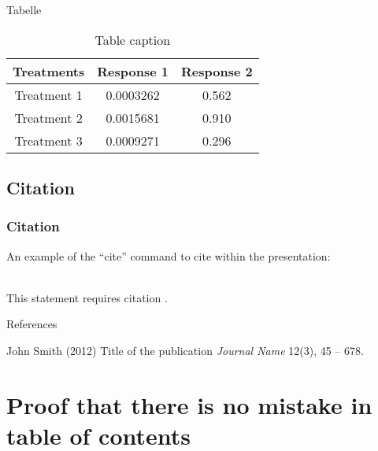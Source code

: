 \begin{frame}{Tabelle}
	\centering
	\begin{table}
		\begin{tabular}{c c c}
			\toprule
			\textbf{Treatments} & \textbf{Response 1} & \textbf{Response 2} \\
			\midrule
			Treatment 1         & 0.0003262           & 0.562               \\
			Treatment 2         & 0.0015681           & 0.910               \\
			Treatment 3         & 0.0009271           & 0.296               \\
			\bottomrule
		\end{tabular}
		\caption{Table caption}
	\end{table}
\end{frame}

\subsection{Citation}

\begin{frame}[Citation]
    \frametitle{Citation}
    An example of the \enquote{cite} command to cite within the presentation:\\~

    This statement requires citation \cite{p1}.
\end{frame}

\begin{frame}{References}
    \footnotesize{
        \begin{thebibliography}{99}
             John Smith (2012)
            \newblock Title of the publication
            \newblock \emph{Journal Name} 12(3), 45 -- 678.
        \end{thebibliography}
    }
\end{frame}

\section[Test]{Proof that there is no mistake in table of contents}